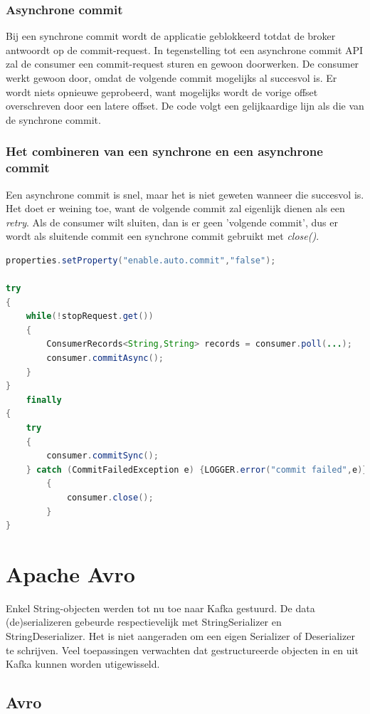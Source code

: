 \documentclass[a4paper,10pt,twoside]{report}
\begin{document}
\subsubsection{Asynchrone commit}

Bij een synchrone commit wordt de applicatie geblokkeerd totdat de broker antwoordt op de commit-request. In tegenstelling tot een asynchrone commit API zal de consumer een commit-request sturen en gewoon doorwerken. De consumer werkt gewoon door, omdat de volgende commit mogelijks al succesvol is. Er wordt niets opnieuwe geprobeerd, want mogelijks wordt de vorige offset overschreven door een latere offset. De code volgt een gelijkaardige lijn als die van de synchrone commit.

\subsubsection{Het combineren van een synchrone en een asynchrone commit}

Een asynchrone commit is snel, maar het is niet geweten wanneer die succesvol is. Het doet er weining toe, want de volgende commit zal eigenlijk dienen als een \textit{retry}. Als de consumer wilt sluiten, dan is er geen 'volgende commit', dus er wordt als sluitende commit een synchrone commit gebruikt met \textit{close()}.

\begin{lstlisting}[language=Java]
properties.setProperty("enable.auto.commit","false");

try
{
	while(!stopRequest.get())
	{
		ConsumerRecords<String,String> records = consumer.poll(...);
		consumer.commitAsync();
	}
} 
	finally 
{
	try 
	{
		consumer.commitSync();
	} catch (CommitFailedException e) {LOGGER.error("commit failed",e)}
		{
			consumer.close();
		}
}
\end{lstlisting}

\section{Apache Avro}

Enkel String-objecten werden tot nu toe naar Kafka gestuurd. De data (de)serializeren gebeurde respectievelijk met StringSerializer en StringDeserializer. Het is niet aangeraden om een eigen Serializer of Deserializer te schrijven. Veel toepassingen verwachten dat gestructureerde objecten in en uit Kafka kunnen worden utigewisseld. 

\subsection{Avro}
\end{document}
